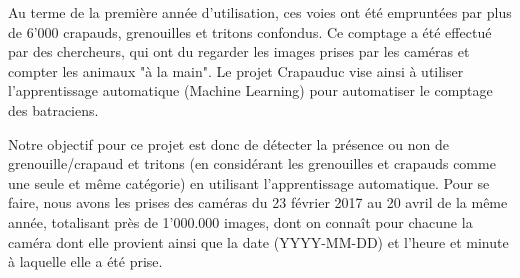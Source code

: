  Au terme de la première année d'utilisation, ces voies ont été empruntées par plus de 6'000 crapauds, grenouilles et tritons confondus. Ce comptage a été effectué par des chercheurs, qui ont du regarder les images prises par les caméras et compter les animaux "à la main". Le projet Crapauduc vise ainsi à utiliser l'apprentissage automatique (Machine Learning) pour automatiser le comptage des batraciens. \newline

Notre objectif pour ce projet est donc de détecter la présence ou non de grenouille/crapaud et tritons (en considérant les grenouilles et crapauds comme une seule et même catégorie) en utilisant l'apprentissage automatique. Pour se faire, nous avons les prises des caméras du 23 février 2017 au 20 avril de la même année, totalisant près de 1'000.000 images, dont on connaît pour chacune la caméra dont elle provient ainsi que la date (YYYY-MM-DD) et l'heure et minute à laquelle elle a été prise.
